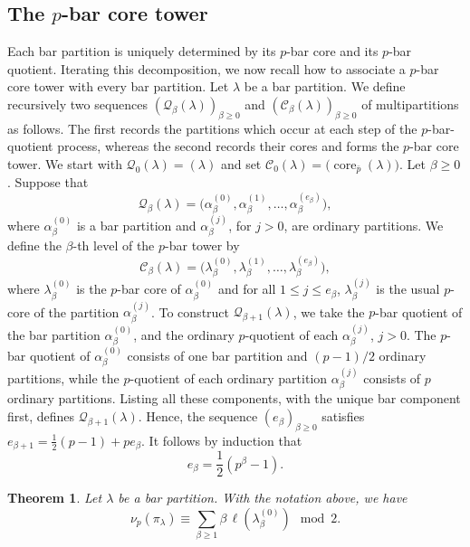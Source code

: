 \documentclass[reqno]{amsart}
\newtheorem{theorem}{Theorem}[section] %
\theoremstyle{definition}
\begin{document}
\subsection{The \( p\)-bar core tower}

Each bar partition is uniquely determined by its $p$-bar core and its
$p$-bar quotient. Iterating this decomposition, we now recall how to
associate a $p$-bar core tower with every bar partition. 
Let \(\lambda\) be a bar partition. We define recursively two sequences
\((\mathcal Q_\beta(\lambda))_{\beta\geq 0}\) and \((\mathcal
C_\beta(\lambda))_{\beta\geq 0}\) of multipartitions as follows. The first
records the partitions which occur at each step of the $p$-bar-quotient
process, whereas the second records their cores and forms the $p$-bar core
tower.
We start with
$
\mathcal Q_0(\lambda)=(\lambda)$ 
and set
$\mathcal C_0(\lambda)
=
\bigl(\operatorname{core}_{\bar p}(\lambda)\bigr)$.
Let $\beta\geq 0$. Suppose that
\[
\mathcal Q_\beta(\lambda)
=
\bigl(
\alpha_\beta^{(0)},
\alpha_\beta^{(1)},
\ldots,
\alpha_\beta^{(e_\beta)}
\bigr),
\]
where \(\alpha_\beta^{(0)}\) is a bar partition and
\(\alpha_\beta^{(j)}\), for \(j>0\), are ordinary partitions.
We define the $\beta$-th level of the $p$-bar tower by
\[
\mathcal C_\beta(\lambda)
=
\bigl(
\lambda_\beta^{(0)},
\lambda_\beta^{(1)},
\ldots,
\lambda_\beta^{(e_\beta)}
\bigr),
\]
where $ \lambda_\beta^{(0)} $ is the $p$-bar core of $\alpha_\beta^{(0)}$
and for all $1\leq j\leq e_\beta$, $ \lambda_\beta^{(j)} $ is the usual
$p$-core of the partition $\alpha_\beta^{(j)}$.
To construct \(\mathcal Q_{\beta+1}(\lambda)\), we take the \(p\)-bar
quotient of the bar partition \(\alpha_\beta^{(0)}\), and the ordinary
\(p\)-quotient of each \(\alpha_\beta^{(j)}\), \(j>0\). The \(p\)-bar
quotient of \(\alpha_\beta^{(0)}\) consists of one bar partition and
\((p-1)/2\) ordinary partitions, while the \(p\)-quotient of each ordinary
partition \(\alpha_\beta^{(j)}\) consists of \(p\) ordinary partitions.
Listing all these components, with the unique bar component first, defines
$\mathcal Q_{\beta+1}(\lambda)$.
Hence, the sequence $(e_\beta)_{\beta\geq 0}$ satisfies $
e_{\beta+1}=\frac{1}{2}(p-1)+pe_\beta$. It follows by induction that 
\begin{equation}
\label{eq:defei}
e_\beta=\frac{1}{2}(p^\beta-1).
\end{equation}

\begin{theorem} 
\label{thm:globalprat}
Let $\lambda$ be a bar partition. With the notation 
above, we have
\[
\nu_p\!\left(\pi_\lambda\right)
\equiv
\sum_{\beta\geq1}\beta \,\ell(\lambda_\beta^{(0)})
\mod2.
\]
\end{theorem}
\end{document}
